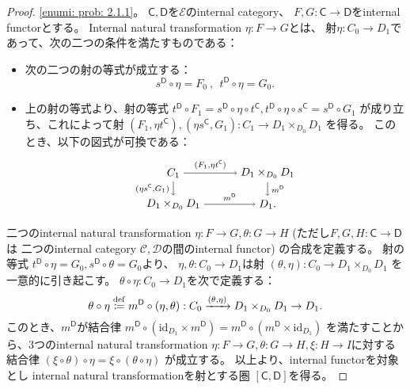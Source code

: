 \documentclass[uplatex]{jsarticle}
\theoremstyle{definition}
\def\id{\mathrm{id}}
\def\mcC{\mathcal{C}}
\def\mcD{\mathcal{D}}
\def\mcE{\mathcal{E}}
\def\msC{\mathsf{C}}
\def\msD{\mathsf{D}}
\newcommand{\dfn}{\overset{\mathrm{\tiny def}}{\coloneqq}}
\begin{document}
\begin{proof}
  \ref{enumi: prob: 2.1.1}。
  \(\msC, \msD\)を\(\mcE\)のinternal category、
  \(F,G:\msC \to \msD\)をinternal functorとする。
  Internal natural transformation \(\eta:F\to G\)とは、
  射\(\eta:C_0\to D_1\)であって、次の二つの条件を満たすものである：
  \begin{itemize}
    \item
    次の二つの射の等式が成立する：
    \[
    s^{\msD}\circ \eta = F_0 \ , \ \ t^{\msD}\circ \eta = G_0.
    \]
    \item
    上の射の等式より、射の等式
    \(t^{\msD}\circ F_1 = s^{\msD}\circ \eta \circ t^{\msC},
    t^{\msD}\circ \eta\circ s^{\msC} = s^{\msD}\circ G_1\)
    が成り立ち、これによって射
    \((F_1,\eta t^{\msC}), (\eta s^{\msC}, G_1) : C_1\to D_1\times_{D_0} D_1\)
    を得る。
    このとき、以下の図式が可換である：
    \[
    \begin{tikzpicture}[auto]
      \node (A) at (0,1) {\(C_1\)};
      \node (C) at (3,1) {\(D_1\times_{D_0} D_1\)};
      \node (A') at (0,0) {\(D_1\times_{D_0} D_1\)};
      \node (C') at (3,0) {\(D_1\).};
      \draw[->] (A) to node {\(\scriptstyle (F_1, \eta t^{\msC})\)} (C);
      \draw[->] (A') to node {\(\scriptstyle m^{\msD}\)} (C');
      \draw[->] (A) to node[swap] {\(\scriptstyle (\eta s^{\msC}, G_1)\)} (A');
      \draw[->] (C) to node {\(\scriptstyle m^{\msD}\)} (C');
    \end{tikzpicture}
    \]
  \end{itemize}

  二つのinternal natural transformation \(\eta:F\to G, \theta: G\to H\)
  (ただし\(F,G,H:\msC\to \msD\)は
  二つのinternal category \(\mcC,\mcD\)の間のinternal functor)
  の合成を定義する。
  射の等式
  \(t^{\msD}\circ \eta = G_0, s^{\msD}\circ \theta = G_0\)より、
  \(\eta,\theta : C_0 \to D_1\)は射
  \((\theta,\eta) : C_0 \to D_1\times_{D_0} D_1\)
  を一意的に引き起こす。
  \(\theta\circ \eta : C_0 \to D_1\)を次で定義する：
  \[
  \theta \circ \eta \dfn m^{\msD}\circ (\eta,\theta) :
  C_0 \xrightarrow{(\theta,\eta)} D_1 \times_{D_0} D_1 \to D_1.
  \]
  このとき、\(m^{\msD}\)が結合律
  \(m^{\msD}\circ (\id_{D_1}\times m^{\msD}) = m^{\msD} \circ (m^{\msD}\times \id_{D_1})\)
  を満たすことから、3つのinternal natural transformation
  \(\eta: F\to G, \theta: G\to H, \xi: H\to I\)に対する結合律
  \((\xi \circ \theta) \circ \eta = \xi \circ (\theta\circ \eta)\)
  が成立する。
  以上より、internal functorを対象とし
  internal natural transformationを射とする圏
  \([\msC,\msD]\)を得る。


\end{proof}
\end{document}
